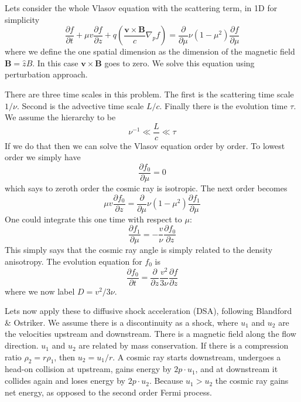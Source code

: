 \documentclass[letterpaper, 11pt]{article}
\numberwithin{equation}{section}
\numberwithin{figure}{section}
\begin{document}
Lets consider the whole Vlasov equation with the scattering term, in 1D for simplicity
\begin{equation}
  \label{eq:18}
  \frac{\partial f}{\partial t} + \mu v\frac{\partial f}{\partial z} + q \left( \frac{\mathbf{v}\times \mathbf{B}}{c} \nabla_pf \right) = \frac{\partial}{\partial\mu}\nu(1 - \mu^2)\frac{\partial f}{\partial \mu}
\end{equation}
where we define the one spatial dimension as the dimension of the magnetic field
$\mathbf{B} = \hat{z}B$. In this case $\mathbf{v}\times \mathbf{B}$ goes to
zero. We solve this equation using perturbation approach.

There are three time scales in this problem. The first is the scattering time
scale $1/\nu$. Second is the advective time scale $L/c$. Finally there is the
evolution time $\tau$. We assume the hierarchy to be
\begin{equation}
  \label{eq:19}
  \nu^{-1} \ll \frac{L}{c} \ll \tau
\end{equation}
If we do that then we can solve the Vlasov equation order by order. To lowest
order we simply have
\begin{equation}
  \label{eq:20}
  \frac{\partial f_0}{\partial \mu} = 0
\end{equation}
which says to zeroth order the cosmic ray is isotropic. The next order becomes
\begin{equation}
  \label{eq:21}
  \mu v \frac{\partial f_0}{\partial z} = \frac{\partial}{\partial\mu}\nu(1 - \mu^2)\frac{\partial f_1}{\partial \mu}
\end{equation}
One could integrate this one time with respect to $\mu$:
\begin{equation}
  \label{eq:22}
  \frac{\partial f_1}{\partial \mu} = -\frac{v}{\nu}\frac{\partial f_0}{\partial z}
\end{equation}
This simply says that the cosmic ray angle is simply related to the density
anisotropy. The evolution equation for $f_0$ is
\begin{equation}
  \label{eq:23}
  \frac{\partial f_0}{\partial t} = \frac{\partial}{\partial z}\frac{v^2}{3\nu}\frac{\partial f}{\partial z}
\end{equation}
where we now label $D = v^2/3\nu$.

Lets now apply these to diffusive shock acceleration (DSA), following Blandford
\& Ostriker. We assume there is a discontinuity as a shock, where $u_1$ and
$u_2$ are the velocities upstream and downstream. There is a magnetic field
along the flow direction. $u_1$ and $u_2$ are related by mass conservation. If
there is a compression ratio $\rho_2 = r\rho_1$, then $u_2 = u_{1}/r$. A cosmic
ray starts downstream, undergoes a head-on collision at upstream, gains energy
by $2p\cdot u_1$, and at downstream it collides again and loses energy by
$2p\cdot u_2$. Because $u_1 > u_2$ the cosmic ray gains net energy, as opposed
to the second order Fermi process.
\end{document}

